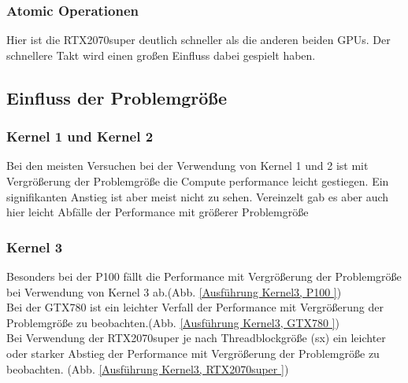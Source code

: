 \documentclass[10pt,a4paper]{article}
\begin{document}
	  \subsubsection{Atomic Operationen}
	  Hier ist die RTX2070super deutlich schneller als die anderen beiden GPUs. Der schnellere Takt wird einen großen Einfluss dabei gespielt haben.
	  \subsection{Einfluss der Problemgröße}
	  \subsubsection{Kernel 1 und Kernel 2}
	  Bei den meisten Versuchen bei der Verwendung von Kernel 1 und 2 ist mit Vergrößerung der Problemgröße die Compute performance leicht gestiegen. Ein signifikanten Anstieg ist aber meist nicht zu sehen. Vereinzelt gab es aber auch hier leicht Abfälle der Performance mit größerer Problemgröße
	  \subsubsection{Kernel 3}
	  Besonders bei der P100 fällt die Performance mit Vergrößerung der Problemgröße bei Verwendung von Kernel 3 ab.(Abb. \ref{Ausführung Kernel3, P100 })\\ Bei der GTX780 ist ein leichter Verfall der Performance mit Vergrößerung der Problemgröße zu beobachten.(Abb. \ref{Ausführung Kernel3, GTX780 })\\
	  Bei Verwendung der RTX2070super je nach Threadblockgröße (sx) ein leichter oder starker Abstieg der Performance mit Vergrößerung der Problemgröße zu beobachten. (Abb. \ref{Ausführung Kernel3, RTX2070super })
\end{document}
